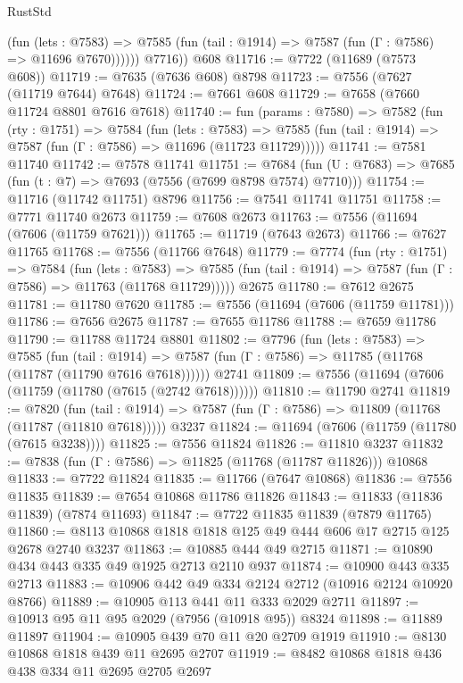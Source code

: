 \begin{lexlean}{RustStd}
\begin{coremodule}
{\begin{coremodule}
{{{{{{{{{{{{{{{{{{{{{{{{{{{{{{{{{{{{{{{{{{{              (fun (lets : @7583) =>
              @7585 (fun (tail : @1914) => @7587 (fun (Γ : @7586) => @11696 @7670))))))
        @7716))
    @608
@11716 := @7722 (@11689 (@7573 @608))
@11719 := @7635 (@7636 @608) @8798
@11723 := @7556 (@7627 (@11719 @7644) @7648)
@11724 := @7661 @608
@11729 := @7658 (@7660 @11724 @8801 @7616 @7618)
@11740 := fun (params : @7580) =>
  @7582
    (fun (rty : @1751) =>
    @7584
      (fun (lets : @7583) =>
      @7585 (fun (tail : @1914) => @7587 (fun (Γ : @7586) => @11696 (@11723 @11729)))))
@11741 := @7581 @11740
@11742 := @7578 @11741
@11751 := @7684 (fun (U : @7683) => @7685 (fun (t : @7) => @7693 (@7556 (@7699 @8798 @7574) @7710)))
@11754 := @11716 (@11742 @11751) @8796
@11756 := @7541 @11741 @11751
@11758 := @7771 @11740 @2673
@11759 := @7608 @2673
@11763 := @7556 (@11694 (@7606 (@11759 @7621)))
@11765 := @11719 (@7643 @2673)
@11766 := @7627 @11765
@11768 := @7556 (@11766 @7648)
@11779 := @7774
    (fun (rty : @1751) =>
    @7584
      (fun (lets : @7583) =>
      @7585 (fun (tail : @1914) => @7587 (fun (Γ : @7586) => @11763 (@11768 @11729)))))
    @2675
@11780 := @7612 @2675
@11781 := @11780 @7620
@11785 := @7556 (@11694 (@7606 (@11759 @11781)))
@11786 := @7656 @2675
@11787 := @7655 @11786
@11788 := @7659 @11786
@11790 := @11788 @11724 @8801
@11802 := @7796
    (fun (lets : @7583) =>
    @7585
      (fun (tail : @1914) =>
      @7587 (fun (Γ : @7586) => @11785 (@11768 (@11787 (@11790 @7616 @7618))))))
    @2741
@11809 := @7556 (@11694 (@7606 (@11759 (@11780 (@7615 (@2742 @7618))))))
@11810 := @11790 @2741
@11819 := @7820
    (fun (tail : @1914) => @7587 (fun (Γ : @7586) => @11809 (@11768 (@11787 (@11810 @7618)))))
    @3237
@11824 := @11694 (@7606 (@11759 (@11780 (@7615 @3238))))
@11825 := @7556 @11824
@11826 := @11810 @3237
@11832 := @7838 (fun (Γ : @7586) => @11825 (@11768 (@11787 @11826))) @10868
@11833 := @7722 @11824
@11835 := @11766 (@7647 @10868)
@11836 := @7556 @11835
@11839 := @7654 @10868 @11786 @11826
@11843 := @11833 (@11836 @11839) (@7874 @11693)
@11847 := @7722 @11835 @11839 (@7879 @11765)
@11860 := @8113 @10868 @1818 @1818 @125 @49 @444 @606 @17 @2715 @125 @2678 @2740 @3237
@11863 := @10885 @444 @49 @2715
@11871 := @10890 @434 @443 @335 @49 @1925 @2713 @2110 @937
@11874 := @10900 @443 @335 @2713
@11883 := @10906 @442 @49 @334 @2124 @2712 (@10916 @2124 @10920 @8766)
@11889 := @10905 @113 @441 @11 @333 @2029 @2711
@11897 := @10913 @95 @11 @95 @2029 (@7956 (@10918 @95)) @8324
@11898 := @11889 @11897
@11904 := @10905 @439 @70 @11 @20 @2709 @1919
@11910 := @8130 @10868 @1818 @439 @11 @2695 @2707
@11919 := @8482 @10868 @1818 @436 @438 @334 @11 @2695 @2705 @2697
}}}}}}}}}}}}}}}}}}}}}}}}}}}}}}}}}}}}}}}}}}}
\end{coremodule}}
\end{coremodule}
\end{lexlean}
